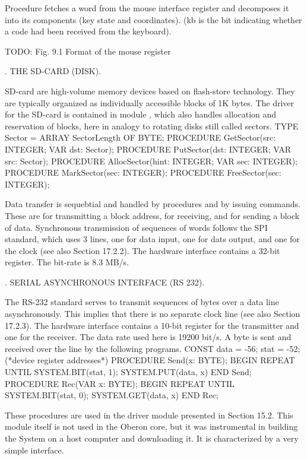 Procedure  fetches a word from the mouse interface register and decomposes it into its components (key state and coordinates). (kb is the bit indicating whether a code had been received from the keyboard).

TODO: Fig. 9.1 Format of the mouse register

. THE SD-CARD (DISK).

SD-card are high-volume memory devices based on flash-store technology. They are typically organized as individually accessible blocks of 1K bytes. The driver for the SD-card is contained in module , which also handles allocation and reservation of blocks, here in analogy to rotating disks still called sectors.
\begintt
TYPE Sector = ARRAY SectorLength OF BYTE;
PROCEDURE GetSector(src: INTEGER; VAR dst: Sector);
PROCEDURE PutSector(dst: INTEGER; VAR src: Sector);
PROCEDURE AllocSector(hint: INTEGER; VAR sec: INTEGER);
PROCEDURE MarkSector(sec: INTEGER);
PROCEDURE FreeSector(sec: INTEGER);
\endtt

\noindent Data transfer is sequebtial and handled by procedures  and  by issuing commands. These are for transmitting a block address, for receiving, and for sending a block of data. Synchronous transmission of sequences of words follows the SPI standard, which uses 3 lines, one for data input, one for dats output, and one for the clock (see also Section 17.2.2). The hardware interface contains a 32-bit register. The bit-rate is 8.3 MB/s.

. SERIAL ASYNCHRONOUS INTERFACE (RS 232).

The RS-232 standard serves to transmit sequences of bytes over a data line asynchronously. This implies that there is no separate clock line (see also Section 17.2.3). The hardware interface contains a 10-bit register for the transmitter and one for the receiver. The data rate used here is 19200 bit/s. A byte is sent and received over the line by the following programs.
\begintt
CONST data = -56; stat = -52; (*device register addresses*)
PROCEDURE Send(x: BYTE); BEGIN
REPEAT UNTIL SYSTEM.BIT(stat, 1);
SYSTEM.PUT(data, x) END Send;
PROCEDURE Rec(VAR x: BYTE); BEGIN
REPEAT UNTIL SYSTEM.BIT(stat, 0);
SYSTEM.GET(data, x) END Rec;
\endtt

\noindent These procedures are used in the driver module  presented in Section 15.2. This module itself is not used in the Oberon core, but it was instrumental in building the System on a host computer and downloading it. It is characterized by a very simple interface.

